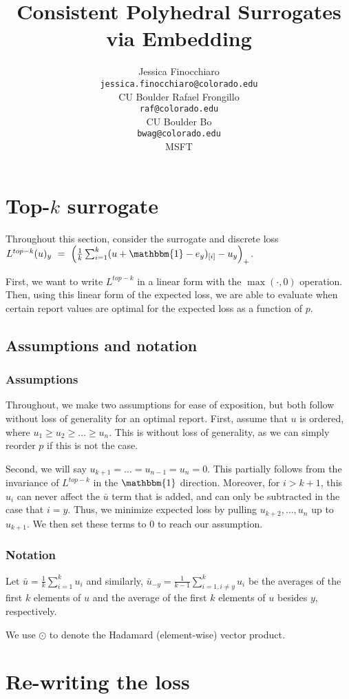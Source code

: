 \documentclass[12pt]{article}
\title{Consistent Polyhedral Surrogates via Embedding}
\author{%
 Jessica Finocchiaro\raf{Jessie?} \\
 \texttt{jessica.finocchiaro@colorado.edu}\\
 CU Boulder
 \And
 Rafael Frongillo\\
 \texttt{raf@colorado.edu}\\
 CU Boulder
 \And
 Bo\\
 \texttt{bwag@colorado.edu}\\
 MSFT
}
\newcommand{\ones}{\mathbbm{1}}
\begin{document}
\appendix


\section{Top-$k$ surrogate}
Throughout this section, consider the surrogate and discrete loss $L^{top-k}(u)_y~=~\left(\frac{1}{k} \sum_{i=1}^k (u + \ones - e_y)_{[i]} - u_y \right)_+$.

First, we want to write $L^{top-k}$ in a linear form with the $\max(\cdot, 0)$ operation.
Then, using this linear form of the expected loss, we are able to evaluate when certain report values are optimal for the expected loss as a function of $p$.

\subsection{Assumptions and notation}
\subsubsection{Assumptions}
Throughout, we make two assumptions for ease of exposition, but both follow without loss of generality for an optimal report.
First, assume that $u$ is ordered, where $u_1 \geq u_2 \geq \ldots \geq u_n$.
This is without loss of generality, as we can simply reorder $p$ if this is not the case.

Second, we will say $u_{k+1} = \ldots = u_{n-1} = u_n = 0$.
This partially follows from the invariance of $L^{top-k}$ in the $\ones$ direction.
Moreover, for $i > k+1$, this $u_i$ can never affect the $\bar{u}$ term that is added, and can only be subtracted in the case that $i = y$.
Thus, we minimize expected loss by pulling $u_{k+2},\ldots, u_n$ up to $u_{k+1}$.
We then set these terms to $0$ to reach our assumption.

\subsubsection{Notation}
Let $\bar{u} = \frac 1 k \sum_{i = 1}^k u_i$ and similarly, $\bar{u}_{-y} = \frac{1}{k-1} \sum_{i=1, i \neq y}^k u_i$ be the averages of the first $k$ elements of $u$ and the average of the first $k$ elements of $u$ besides $y$, respectively.

We use $\odot$ to denote the Hadamard (element-wise) vector product.

\section{Re-writing the loss}
\end{document}
